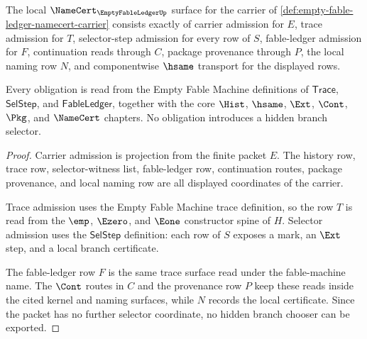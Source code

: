 
\begin{theorem}
\label{thm:empty-fable-ledger-namecert-obligation-surface}
The local $\NameCert_{\EmptyFableLedgerUp}$ surface for the carrier of \autoref{def:empty-fable-ledger-namecert-carrier} consists exactly of carrier admission for $E$, trace admission for $T$, selector-step admission for every row of $S$, fable-ledger admission for $F$, continuation reads through $C$, package provenance through $P$, the local naming row $N$, and componentwise $\hsame$ transport for the displayed rows.

Every obligation is read from the Empty Fable Machine definitions of $\mathsf{Trace}$, $\mathsf{SelStep}$, and $\mathsf{FableLedger}$, together with the core $\Hist$, $\hsame$, $\Ext$, $\Cont$, $\Pkg$, and $\NameCert$ chapters. No obligation introduces a hidden branch selector.
\end{theorem}
\begin{proof}
Carrier admission is projection from the finite packet $E$. The history row, trace row, selector-witness list, fable-ledger row, continuation routes, package provenance, and local naming row are all displayed coordinates of the carrier.

Trace admission uses the Empty Fable Machine trace definition, so the row $T$ is read from the $\emp$, $\Ezero$, and $\Eone$ constructor spine of $H$. Selector admission uses the $\mathsf{SelStep}$ definition: each row of $S$ exposes a mark, an $\Ext$ step, and a local branch certificate.

The fable-ledger row $F$ is the same trace surface read under the fable-machine name. The $\Cont$ routes in $C$ and the provenance row $P$ keep these reads inside the cited kernel and naming surfaces, while $N$ records the local certificate. Since the packet has no further selector coordinate, no hidden branch chooser can be exported.
\end{proof}

